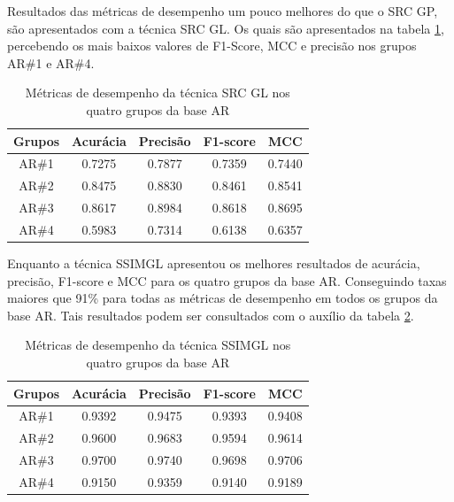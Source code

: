 Resultados das métricas de desempenho um pouco melhores do que o SRC GP, são apresentados com a técnica SRC GL. Os quais são apresentados na tabela \ref{tab:metricas_src_gl}, percebendo os mais baixos valores de F1-Score, MCC e precisão nos grupos AR\#1 e AR\#4.

\begin{table}[htpb]
    \centering
	\caption{Métricas de desempenho da técnica SRC GL nos quatro grupos da base AR}
\begin{tabular}{|c|c|c|c|c|}
\hline
\textbf{Grupos} & \textbf{Acurácia}  & \textbf{Precisão} & \textbf{F1-score} & \textbf{MCC} \\\hline
AR\#1&	0.7275&	0.7877&	0.7359&	0.7440\\\hline
AR\#2&	0.8475&	0.8830&	0.8461&	0.8541\\\hline
AR\#3&	0.8617&	0.8984&	0.8618&	0.8695\\\hline
AR\#4&	0.5983&	0.7314&	0.6138&	0.6357\\\hline
\end{tabular}
\label{tab:metricas_src_gl}
\end{table}

Enquanto a técnica SSIMGL apresentou os melhores resultados de acurácia, precisão, F1-score e MCC para  os  quatro grupos da base AR. Conseguindo taxas maiores que 91\% para todas as métricas de desempenho em todos os grupos da base AR. Tais resultados podem ser consultados com o auxílio da tabela \ref{tab:metricas_ssimgl}.

\begin{table}[htpb]
    \centering
	\caption{Métricas de desempenho da técnica SSIMGL nos quatro grupos da base AR}
\begin{tabular}{|c|c|c|c|c|}
\hline
\textbf{Grupos} & \textbf{Acurácia} & \textbf{Precisão} & \textbf{F1-score} & \textbf{MCC} \\\hline
AR\#1	& 0.9392& 0.9475 &	0.9393	&0.9408 \\\hline
AR\#2	& 0.9600& 0.9683 &	0.9594	&0.9614 \\\hline
AR\#3	& 0.9700& 0.9740 &	0.9698	&0.9706 \\\hline
AR\#4	& 0.9150& 0.9359 &	0.9140	&0.9189 \\\hline
\end{tabular}
\label{tab:metricas_ssimgl}
\end{table}





